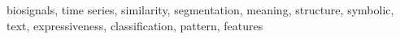 %
%
%

\begin{keywords}
biosignals, time series, similarity, segmentation, meaning, structure, symbolic, text, expressiveness, classification, pattern, features
\end{keywords} 
